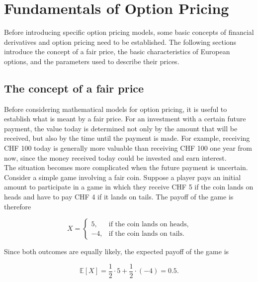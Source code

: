 \documentclass{article}
\begin{document}
	\section{Fundamentals of Option Pricing}
	
	Before introducing specific option pricing models, some basic concepts of financial derivatives and option pricing need to be established. The following sections introduce the concept of a fair price, the basic characteristics of European options, and the parameters used to describe their prices.
	
	\subsection{The concept of a fair price}
	
	Before considering mathematical models for option pricing, it is useful to establish what is meant by a fair price. For an investment with a certain future payment, the value today is determined not only by the amount that will be received, but also by the time until the payment is made. For example, receiving CHF 100 today is generally more valuable than receiving CHF 100 one year from now, since the money received today could be invested and earn interest.\\
	The situation becomes more complicated when the future payment is uncertain. Consider a simple game involving a fair coin. Suppose a player pays an initial amount to participate in a game in which they receive CHF 5 if the coin lands on heads and have to pay CHF 4 if it lands on tails. The payoff of the game is therefore
	
	\[
	X = \begin{cases}
	5, & \text{if the coin lands on heads}, \\
	-4, & \text{if the coin lands on tails}.
	\end{cases}
	\]
	
	Since both outcomes are equally likely, the expected payoff of the game is 
	
	\[
	\mathbb{E}[X] = \frac{1}{2}\cdot 5 + \frac{1}{2}\cdot(-4) = 0.5.
	\]
	
\end{document}
